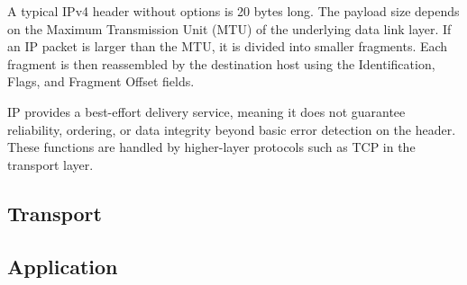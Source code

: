 A typical IPv4 header without options is 20 bytes long.
The payload size depends on the Maximum Transmission Unit
(MTU) of the underlying data link layer. If an IP packet
is larger than the MTU, it is divided into smaller fragments.
Each fragment is then reassembled by the destination host
using the Identification, Flags, and Fragment Offset fields.

IP provides a best-effort delivery service, meaning it does
not guarantee reliability, ordering, or data integrity beyond
basic error detection on the header. These functions are
handled by higher-layer protocols such as TCP in the transport layer.

\subsection{Transport}

\subsection{Application}


